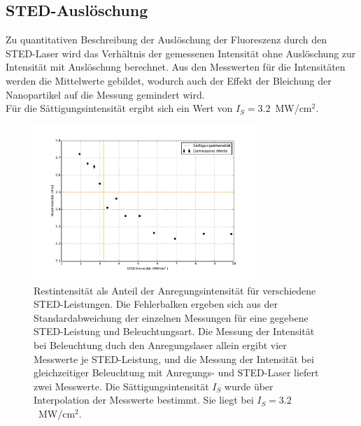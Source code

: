 \subsection{STED-Auslöschung}
Zu quantitativen Beschreibung der Auslöschung der Fluoreszenz durch den STED-Laser wird das Verhältnis der gemessenen Intensität ohne Auslöschung zur Intensität mit Auslöschung berechnet.
Aus den Messwerten für die Intensitäten werden die Mittelwerte gebildet, wodurch auch der Effekt der Bleichung der Nanopartikel auf die Messung gemindert wird.
\\
Für die Sättigungsintensität ergibt sich ein Wert von $I_S = 3.2$~MW/cm$^2$.
\begin{figure}
	\centering
	\includegraphics[width=0.75\textwidth]{plots/depletion.pdf}
	\caption{Restintensität als Anteil der Anregungsintensität für verschiedene STED-Leistungen. 
		Die Fehlerbalken ergeben sich aus der Standardabweichung der einzelnen Messungen für eine gegebene STED-Leistung und Beleuchtungsart. 
		Die Messung der Intensität bei Beleuchtung duch den Anregungslaser allein ergibt vier Messwerte je STED-Leistung, und die Messung der Intensität bei gleichzeitiger Beleuchtung mit Anregungs- und STED-Laser liefert zwei Messwerte.
		Die Sättigungsintensität $I_S$ wurde über Interpolation der Messwerte bestimmt. 
		Sie liegt bei $I_S = 3.2$~MW/cm$^2$.
}\label{fig:depletion}
\end{figure}

